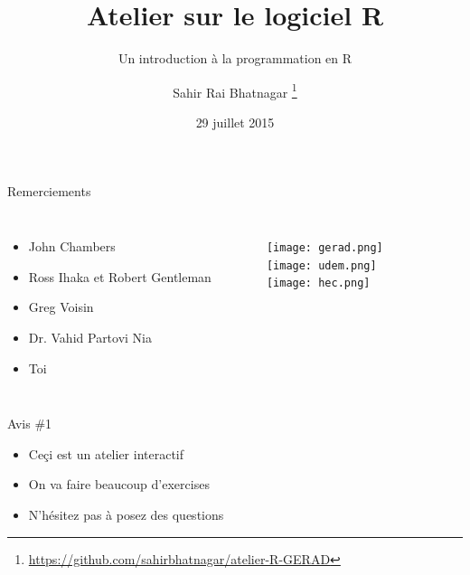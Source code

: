 \documentclass[11pt]{beamer}\usepackage[]{graphicx}\usepackage[]{color}
\begin{document}
\title[Atelier sur le logiciel R]{Atelier sur le logiciel R}
\subtitle{Un introduction \`{a} la programmation en R}

\author[]{Sahir Rai Bhatnagar%
\thanks{\href{https://github.com/sahirbhatnagar/atelier-R-GERAD}{https://github.com/sahirbhatnagar/atelier-R-GERAD}%
}}

\date{29 juillet 2015}


\maketitle

\begin{frame}{Remerciements}
\begin{columns}[c] %


\begin{itemize}
\item John Chambers
\item Ross Ihaka et Robert Gentleman
\item Greg Voisin
\item Dr. Vahid Partovi Nia
\item Toi
\end{itemize}

\begin{figure}
\texttt{[image: gerad.png]}\\[2mm]
\texttt{[image: udem.png]}\\[5mm]
\texttt{[image: hec.png]}
\end{figure}

\end{columns}
\end{frame}


\begin{frame}{Avis \#1}
\begin{itemize}
\item Ce\c{c}i est un atelier interactif
\item On va faire beaucoup d'exercises
\item N'h\'{e}sitez pas \`{a} posez des questions
\end{itemize}
\end{frame}
\end{document}
